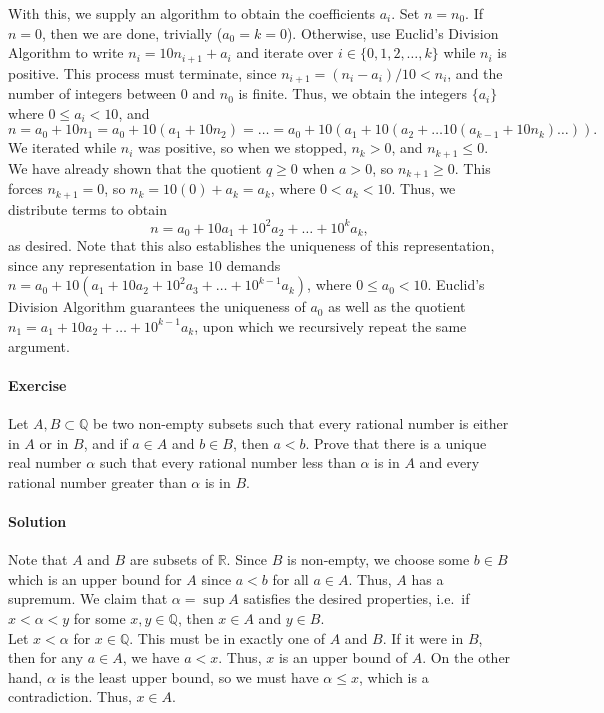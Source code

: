 \documentclass[10pt]{article}
\newcounter{prob}
\def\problem{\stepcounter{prob}\paragraph{Exercise \arabic{prob}}}
\def\solution{\paragraph{Solution}}
\begin{document}
        With this, we supply an algorithm to obtain the coefficients $a_i$. Set $n = n_0$. If $n = 0$, then we are done, trivially ($a_0 = k = 0$).
        Otherwise, use Euclid's Division Algorithm to write $n_i = 10n_{i + 1} + a_i$ and iterate over $i \in \{0, 1, 2, \dots, k\}$
        while $n_i$ is positive.
        This process must terminate, since $n_{i + 1} = (n_i - a_i) /10 < n_i$, and the number of integers between $0$ and $n_0$ is finite.
        Thus, we obtain the integers $\{a_i\}$ where $0 \leq a_i < 10$, and
        \[
                n = a_0 + 10n_1 = a_0 + 10(a_1 + 10n_2) = \dots = a_0 + 10(a_1 + 10(a_2 + \dots 10(a_{k - 1} + 10n_k)\dots)).
        \]
        We iterated while $n_i$ was positive, so when we stopped, $n_k > 0$, and $n_{k + 1} \leq 0$. We have already shown that the quotient $q \geq 0$
        when $a > 0$, so $n_{k + 1} \geq 0$. This forces $n_{k + 1} = 0$, so $n_k = 10(0) + a_k = a_k$, where $0 < a_k < 10$.
        Thus, we distribute terms to obtain
        \[
                n = a_0 + 10a_1 + 10^2a_2 + \dots + 10^k a_k,
        \]
        as desired. Note that this also establishes the uniqueness of this representation, since any representation in base $10$ demands
        $n = a_0 + 10(a_1 + 10a_2 + 10^2a_3 + \dots + 10^{k-1}a_k)$, where $0 \leq a_0 < 10$. Euclid's Division Algorithm guarantees
        the uniqueness of $a_0$ as well as the quotient $n_1 = a_1 + 10a_2 + \dots + 10^{k - 1}a_k$, upon which we recursively repeat the same argument.


        \problem Let $A, B \subset \mathbb{Q}$ be two non-empty subsets such that every rational number is either in $A$ or in $B$, 
        and if $a \in A$ and $b \in B$, then $a < b$. Prove that there is a unique real number $\alpha$ such that every rational number
        less than $\alpha$ is in $A$ and every rational number greater than $\alpha$ is in $B$.
        
        \solution Note that $A$ and $B$ are subsets of $\mathbb{R}$. Since $B$ is non-empty, we choose some $b \in B$ which 
        is an upper bound for $A$ since $a < b$ for all $a \in A$. Thus, $A$ has a supremum. We claim that $\alpha = \sup{A}$ satisfies the 
        desired properties, i.e.\ if $x < \alpha < y$ for some $x, y \in \mathbb{Q}$, then $x \in A$ and $y \in B$. \\

        Let $x < \alpha$ for $x \in \mathbb{Q}$. This must be in exactly one of $A$ and $B$. If it were in $B$, then for any $a \in A$,
        we have $a < x$. Thus, $x$ is an upper bound of $A$. On the other hand, $\alpha$ is the least upper bound, so we must have
        $\alpha \leq x$, which is a contradiction. Thus, $x \in A$.
\end{document}

